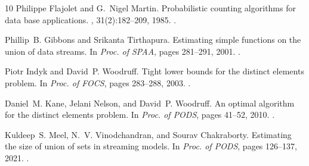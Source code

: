 \documentclass[a4paper,UKenglish,cleveref, autoref, thm-restate]{lipics-v2021}
\begin{document}
\begin{thebibliography}{10}
Philippe Flajolet and G.~Nigel Martin.
\newblock Probabilistic counting algorithms for data base applications.
, 31(2):182--209, 1985.
\newblock \href {https://doi.org/10.1016/0022-0000(85)90041-8}
  {}.

Phillip~B. Gibbons and Srikanta Tirthapura.
\newblock Estimating simple functions on the union of data streams.
\newblock In {\em Proc. of {SPAA}}, pages 281--291, 2001.
\newblock \href {https://doi.org/10.1145/378580.378687}
  {}.

Piotr Indyk and David~P. Woodruff.
\newblock Tight lower bounds for the distinct elements problem.
\newblock In {\em Proc. of FOCS}, pages 283--288, 2003.
\newblock \href {https://doi.org/10.1109/SFCS.2003.1238202}
  {}.

Daniel~M. Kane, Jelani Nelson, and David~P. Woodruff.
\newblock An optimal algorithm for the distinct elements problem.
\newblock In {\em Proc. of {PODS}}, pages 41--52, 2010.
\newblock \href {https://doi.org/10.1145/1807085.1807094}
  {}.

Kuldeep~S. Meel, N.~V. Vinodchandran, and Sourav Chakraborty.
\newblock Estimating the size of union of sets in streaming models.
\newblock In {\em Proc. of PODS}, pages 126--137, 2021.
\newblock \href {https://doi.org/10.1145/3452021.3458333}
  {}.

\end{thebibliography}
\end{document}
